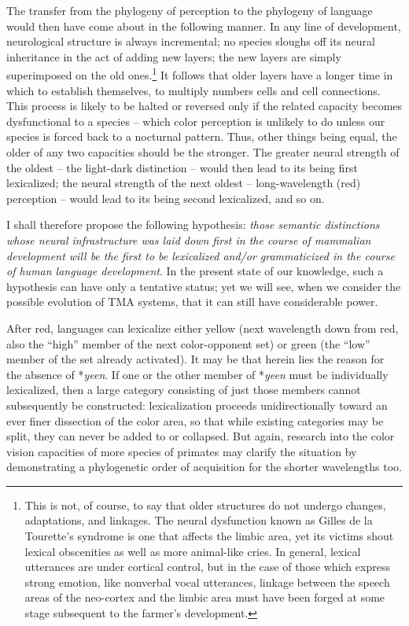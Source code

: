 The transfer from the phylogeny of perception to the phylogeny of language would then have come about in the following manner. In any line of development, neurological structure is always incremental; no species sloughs off its neural inheritance in the act of adding new layers; the new layers are simply superimposed on the old ones.\footnote{This is not, of course, to say that older structures do not undergo changes, adaptations, and linkages. The neural dysfunction known as Gilles de la Tourette's syndrome is one that affects the limbic area, yet its victims shout lexical obscenities as well as more animal-like cries. In general, lexical utterances are under cortical control, but in the case of those which express strong emotion, like nonverbal vocal utterances, linkage between the speech areas of the neo-cortex and the limbic area must have been forged at some stage subsequent to the farmer's development.} It follows that older layers have a longer time in which to establish themselves, to multiply numbers cells and cell connections. This process is likely to be halted or reversed only if the related capacity becomes dysfunctional to a species -- which color perception is unlikely to do unless our species is forced back to a nocturnal pattern. Thus, other things being equal, the older of any two capacities should be the stronger. The greater neural strength of the oldest -- the light-dark distinction -- would then lead to its being first lexicalized; the neural strength of the next oldest -- long-wavelength (red) perception -- would lead to its being second lexicalized, and so on.

I shall therefore propose the following hypothesis: \textit{those semantic distinctions whose neural infrastructure was laid down first in the course of mammalian development will be the first to be lexicalized and/or grammaticized in the course of human language development}. In the present state of our knowledge, such a hypothesis can have only a tentative status; yet we will see, when we consider the possible evolution of TMA systems, that it can still have considerable power.

After red, languages can lexicalize either yellow (next wavelength down from red, also the ``high'' member of the next color-opponent set) or green (the ``low'' member of the set already activated). It may be that herein lies the reason for the absence of *\textit{yeen}. If one or the other member of *\textit{yeen} must be individually lexicalized, then a large category consisting of just those members cannot subsequently be constructed: lexicalization proceeds unidirectionally toward an ever finer dissection of the color area, so that while existing categories
may be split, they can never be added to or collapsed. But again, research into the color vision capacities of more species of primates may clarify the situation by demonstrating a phylogenetic order of acquisition for the shorter wavelengths too.

